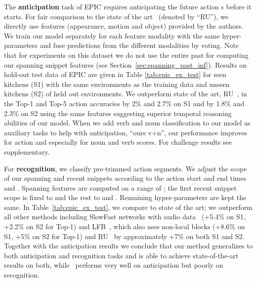 \documentclass[runningheads]{llncs}
\begin{document}
The \textbf{anticipation} task of EPIC requires anticipating the future action s before it starts. For fair comparison to the state of the art~\cite{furnari2019rulstm} (denoted by ``RU''), 
we directly use features (appearance, motion and object) provided by the authors. We train our model separately for each feature modality with the same hyper-parameters and fuse predictions from the different modalities by voting. Note that for experiments on this dataset we do not use the entire past for computing our spanning snippet features (see Section~\ref{sec:spanning_past_inf}).  
Results on hold-out test data of EPIC are given in Table \ref{tab:epic_ex_test} for seen kitchens (S1) with the same environments as the training data and unseen kitchens (S2) of held out environments.
We outperform state of the art, RU~\cite{furnari2019rulstm}, in the Top-1 and Top-5 action accuracies by 2\% and 2.7\% on S1 and by 1.8\% and 2.3\% on S2 using the same features suggesting superior temporal reasoning abilities of our model. When we add verb and noun classification to our model as auxiliary tasks to help with anticipation, ``ours v+n'', our performance improves for action and especially for noun and verb scores.  For challenge results  see supplementary. 

For \textbf{recognition}, we classify pre-trimmed action segments. We adjust the scope of our spanning and recent snippets according to the action start and end times  and . Spanning  features are computed on a range of ; the first recent snippet scope is fixed to  and the rest to  and . Remaining hyper-parameters are kept the same. In Table~\ref{tab:epic_ex_test}, we compare to state of the art; we outperform all other  methods including SlowFast networks with audio data~\cite{xiao2020audiovisual} (+5.4\% on S1, +2.2\% on S2 for Top-1) and LFB~\cite{lfb2019}, which also uses non-local blocks (+8.6\% on S1, +5\% on S2 for Top-1) and RU~\cite{furnari2019rulstm} by approximately +7\% on both S1 and S2. Together with the anticipation results we conclude that our method generalizes to both anticipation and recognition tasks and is able to achieve state-of-the-art results on both, while~\cite{furnari2019rulstm} performs very well on anticipation but poorly on recognition.
\end{document}
